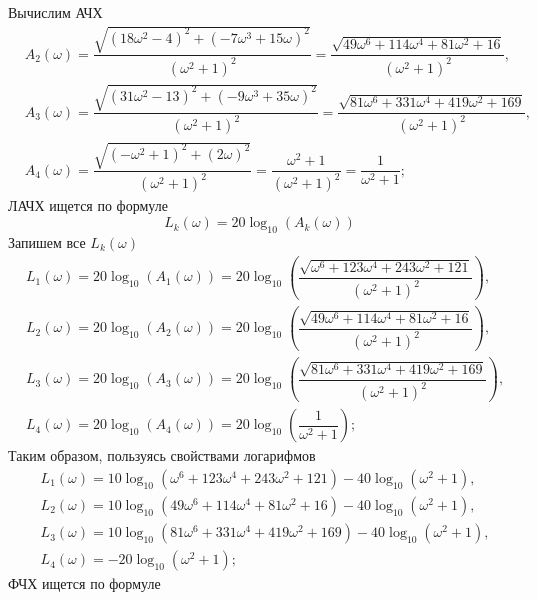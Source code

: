 \documentclass[a4paper, 12pt]{article}
\begin{document}
    Вычислим АЧХ
    \begin{align*}
    &A_2\left( \omega \right)=\dfrac{\sqrt{\left( 18\omega^2-4 \right)^2+\left( -7\omega^3+15\omega \right)^2}}{\left( \omega^2+1 \right)^2}=\dfrac{\sqrt{49\omega^6+114\omega^4+81\omega^2+16}}{\left( \omega^2+1 \right)^2},\\
    &A_3(\omega)=\dfrac{\sqrt{\left( 31\omega^2-13 \right)^2+\left( -9\omega^3+35\omega \right)^2}}{\left( \omega^2+1 \right)^2}=\dfrac{\sqrt{81\omega^6+331\omega^4+419\omega^2+169}}{\left( \omega^2+1 \right)^2},\\
    &A_4\left( \omega \right)=\dfrac{\sqrt{\left( -\omega^2+1 \right)^2+\left( 2\omega \right)^2}}{\left( \omega^2+1 \right)^2}=\dfrac{\omega^2+1}{\left( \omega^2+1 \right)^2}=\dfrac{1}{\omega^2+1};
    \end{align*}
    ЛАЧХ ищется по формуле
    $$
    L_k(\omega)=20\log_{10}\left( A_k(\omega) \right)
    $$
    Запишем все $L_k(\omega)$
    \begin{align*}
        &L_1(\omega)=20\log_{10}\left( A_1(\omega) \right)=20\log_{10}\left( \dfrac{\sqrt{\omega^6+123\omega^4+243\omega^2+121}}{\left( \omega^2+1 \right)^2} \right),\\
        &L_2(\omega)=20\log_{10}\left( A_2(\omega) \right)=20\log_{10}\left( \dfrac{\sqrt{49\omega^6+114\omega^4+81\omega^2+16}}{\left( \omega^2+1 \right)^2} \right),\\
        &L_3\left( \omega \right)=20\log_{10}\left( A_3(\omega) \right)=20\log_{10}\left( \dfrac{\sqrt{81\omega^6+331\omega^4+419\omega^2+169}}{\left( \omega^2+1 \right)^2} \right),\\
        &L_4(\omega)=20\log_{10}\left( A_4(\omega) \right)=20\log_{10}\left( \dfrac{1}{\omega^2+1} \right);
    \end{align*}
    Таким образом, пользуясь свойствами логарифмов
    \begin{align*}
    &L_1(\omega)=10\log_{10}\left( \omega^6+123\omega^4+243\omega^2+121 \right)-40\log_{10}\left( \omega^2+1 \right),\\
    &L_2\left( \omega \right)=10\log_{10}\left( 49\omega^6+114\omega^4+81\omega^2+16 \right)-40\log_{10}\left( \omega^2+1 \right),\\
    &L_3\left( \omega \right)=10\log_{10}\left( 81\omega^6+331\omega^4+419\omega^2+169 \right)-40\log_{10}\left( \omega^2+1 \right),\\
    &L_4\left( \omega \right)=-20\log_{10}\left( \omega^2+1 \right);
    \end{align*}
    ФЧХ ищется по формуле
\end{document}
